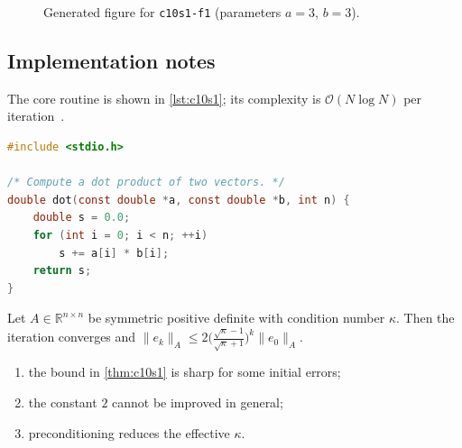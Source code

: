 \begin{figure}[htbp]
\centering
{}
\caption{Generated figure for \texttt{c10s1-f1} (parameters $a=3$, $b=3$).}\label{fig:c10s1-f1}
\end{figure}

\lipsum[102-103]

\subsection{Implementation notes}\label{sec:c10s1-i}
The core routine is shown in \cref{lst:c10s1}; its complexity is $\mathcal{O}(N\log N)$ per iteration~\cite{main-14}.

\begin{lstlisting}[language=c,caption={Reference implementation for c10s1.},label={lst:c10s1}]
#include <stdio.h>

/* Compute a dot product of two vectors. */
double dot(const double *a, const double *b, int n) {
    double s = 0.0;
    for (int i = 0; i < n; ++i)
        s += a[i] * b[i];
    return s;
}
\end{lstlisting}

\lipsum[88-88]
\begin{theorem}\label{thm:c10s1}
Let $A\in\mathbb{R}^{n\times n}$ be symmetric positive definite with condition number $\kappa$. Then the iteration converges and
$\lVert e_k\rVert_A \le 2\bigl(\tfrac{\sqrt\kappa-1}{\sqrt\kappa+1}\bigr)^k\lVert e_0\rVert_A$.
\end{theorem}
\begin{enumerate}[label=(\roman*)]
\item the bound in \cref{thm:c10s1} is sharp for some initial errors;
\item the constant $2$ cannot be improved in general;
\item preconditioning reduces the effective $\kappa$.
\end{enumerate}

\lipsum[9-9]
